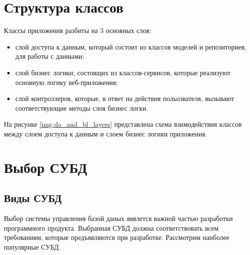 \section{Структура классов}

Классы приложения разбиты на 3 основных слоя:

\begin{itemize}
    \item слой доступа к данным, который состоит из классов моделей и репозиториев, для работы с данными;
    \item слой бизнес логики, состоящих из классов-сервисов, которые реализуют основную логику веб-приложения;
    \item слой контроллеров, которые, в ответ на действия польозвателя, вызывают соответствующие методы слоя бизнес логки.
\end{itemize}

На рисунке \ref{img:da_and_bl_layers} представлена схема взимодействия классов между слоем доступа к данным и слоем бизнес логики приложения. 

\newpage


\section{Выбор СУБД}

\subsection{Виды СУБД}

Выбор системы управления базой даных явялется важной частью разработки программного продукта. Выбранная СУБД должна соответствовать всем требованиям, которые предъявляются при разработке. Рассмотрим наиболее популярные СУБД. 

